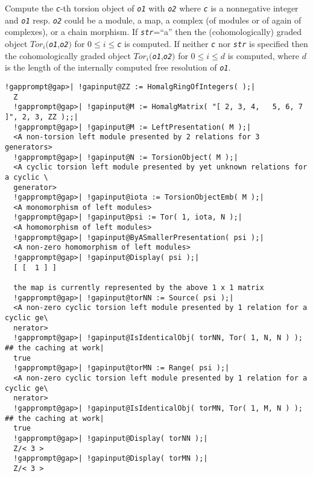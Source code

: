 \documentclass[a4paper,11pt]{report}
\begin{document}
{{{ Compute the \mbox{\texttt{\mdseries\slshape c}}-th torsion object of \mbox{\texttt{\mdseries\slshape o1}} with \mbox{\texttt{\mdseries\slshape o2}} where \mbox{\texttt{\mdseries\slshape c}} is a nonnegative integer and \mbox{\texttt{\mdseries\slshape o1}} resp. \mbox{\texttt{\mdseries\slshape o2}} could be a module, a map, a complex (of modules or of again of complexes), or
a chain morphism. If \mbox{\texttt{\mdseries\slshape str}}=``a'' then the (cohomologically) graded object $Tor_i($\mbox{\texttt{\mdseries\slshape o1}},\mbox{\texttt{\mdseries\slshape o2}}$)$ for $0 \leq i \leq$\mbox{\texttt{\mdseries\slshape c}} is computed. If neither \mbox{\texttt{\mdseries\slshape c}} nor \mbox{\texttt{\mdseries\slshape str}} is specified then the cohomologically graded object $Tor_i($\mbox{\texttt{\mdseries\slshape o1}},\mbox{\texttt{\mdseries\slshape o2}}$)$ for $0 \leq i \leq d$ is computed, where $d$ is the length of the internally computed free resolution of \mbox{\texttt{\mdseries\slshape o1}}. 
\begin{Verbatim}[commandchars=!@|,fontsize=\small,frame=single,label=Example]
  !gapprompt@gap>| !gapinput@ZZ := HomalgRingOfIntegers( );|
  Z
  !gapprompt@gap>| !gapinput@M := HomalgMatrix( "[ 2, 3, 4,   5, 6, 7 ]", 2, 3, ZZ );;|
  !gapprompt@gap>| !gapinput@M := LeftPresentation( M );|
  <A non-torsion left module presented by 2 relations for 3 generators>
  !gapprompt@gap>| !gapinput@N := TorsionObject( M );|
  <A cyclic torsion left module presented by yet unknown relations for a cyclic \
  generator>
  !gapprompt@gap>| !gapinput@iota := TorsionObjectEmb( M );|
  <A monomorphism of left modules>
  !gapprompt@gap>| !gapinput@psi := Tor( 1, iota, N );|
  <A homomorphism of left modules>
  !gapprompt@gap>| !gapinput@ByASmallerPresentation( psi );|
  <A non-zero homomorphism of left modules>
  !gapprompt@gap>| !gapinput@Display( psi );|
  [ [  1 ] ]
  
  the map is currently represented by the above 1 x 1 matrix
  !gapprompt@gap>| !gapinput@torNN := Source( psi );|
  <A non-zero cyclic torsion left module presented by 1 relation for a cyclic ge\
  nerator>
  !gapprompt@gap>| !gapinput@IsIdenticalObj( torNN, Tor( 1, N, N ) );	## the caching at work|
  true
  !gapprompt@gap>| !gapinput@torMN := Range( psi );|
  <A non-zero cyclic torsion left module presented by 1 relation for a cyclic ge\
  nerator>
  !gapprompt@gap>| !gapinput@IsIdenticalObj( torMN, Tor( 1, M, N ) );	## the caching at work|
  true
  !gapprompt@gap>| !gapinput@Display( torNN );|
  Z/< 3 >
  !gapprompt@gap>| !gapinput@Display( torMN );|
  Z/< 3 >
\end{Verbatim}
 }

}}
\end{document}
